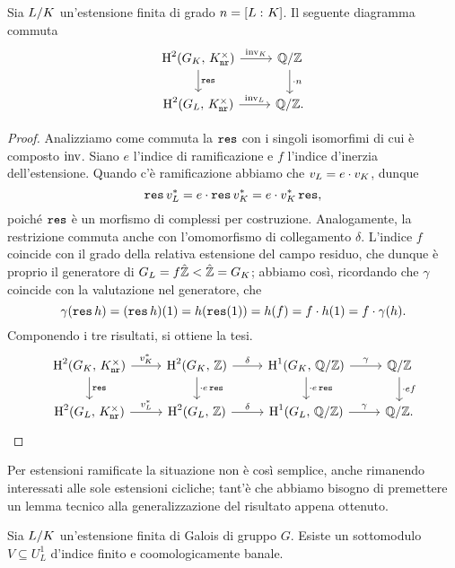 \begin{proposition}
	Sia $ L/K $ un'estensione finita di grado $ n = [L\, \colon K] $. Il seguente diagramma commuta
	\[ \begin{tikzcd}
	\HH^2(G_\K, \, \knr^\times) \rar["\inv_\K"] \dar["\Res"]
	& \Q/\Z \dar["\cdot n"] \\
	\HH^2(G_L, \, \knr^\times) \rar["\inv_L"]
	& \Q/\Z.
	\end{tikzcd} \]
\end{proposition}
\begin{proof}
	Analizziamo come commuta la $ \operatorname{\mathtt{res}} $ con i singoli isomorfimi di cui è composto $ \operatorname{inv} $. Siano $ e $ l'indice di ramificazione e $ f $ l'indice d'inerzia dell'estensione. Quando c'è ramificazione abbiamo che $ v_L = e \cdot v_K $, dunque
	\[ \operatorname{\mathtt{res}} v_L^* = e \cdot \operatorname{\mathtt{res}} v_K^* = e \cdot v_K^* \operatorname{\mathtt{res}}, \]
	poiché $ \operatorname{\mathtt{res}} $ è un morfismo di complessi per costruzione. 
	Analogamente, la restrizione commuta anche con l'omomorfismo di collegamento $ \delta $. L'indice $ f $ coincide con il grado della relativa estensione del campo residuo, che dunque è proprio il generatore di $ G_L = f\hat{\mathbb{Z}} < \hat{\mathbb{Z}} = G_K $; abbiamo così, ricordando che $ \gamma $ coincide con la valutazione nel generatore, che
	$$  \gamma(\operatorname{\mathtt{res}} h) = (\operatorname{\mathtt{res}} h)(1) = h(\operatorname{\mathtt{res}}(1)) = h(f) = f\cdot h(1) = f \cdot  \gamma(h).  $$
	Componendo i tre risultati, si ottiene la tesi.
	\[ \begin{tikzcd}
	\HH^2(G_\K, \, \knr^\times) \rar["v_\K^*"] \dar["\Res"]
	& \HH^2(G_\K, \, \Z) \dar["\cdot e\Res"] \rar["\delta"]
	& \HH^1(G_\K, \, \Q/\Z) \rar["\gamma"] \dar["\cdot e\Res"]
	& \Q/\Z \dar["\cdot ef"] \\
	\HH^2(G_L, \, \knr^\times) \rar["v_L^*"]
	& \HH^2(G_L, \, \Z) \rar["\delta"]
	& \HH^1(G_L, \, \Q/\Z) \rar["\gamma"]
	& \Q/\Z.
	\end{tikzcd} \]
\end{proof}

Per estensioni ramificate la situazione non è così semplice, anche rimanendo interessati alle sole estensioni cicliche; tant'è che abbiamo bisogno di premettere un lemma tecnico alla generalizzazione del risultato appena ottenuto.

\begin{lemma} \todo[dimostrare]
	Sia $ L/K $ un'estensione finita di Galois di gruppo $ G $. Esiste un sottomodulo $ V \subseteq U_L^1 $ d'indice finito e coomologicamente banale.
\end{lemma}


